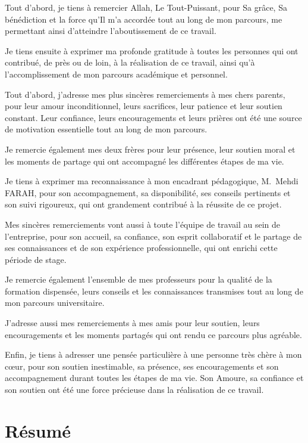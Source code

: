 \documentclass[a4paper,12pt,oneside]{report}
\begin{document}
	Tout d'abord, je tiens \`a remercier Allah, Le Tout-Puissant, pour Sa gr\^ace, Sa b\'en\'ediction et la force qu'Il m'a accord\'ee tout au long de mon parcours, me permettant ainsi d'atteindre l'aboutissement de ce travail. 
	
	Je tiens ensuite \`a exprimer ma profonde gratitude \`a toutes les personnes qui ont contribu\'e, de pr\`es ou de loin, \`a la r\'ealisation de ce travail, ainsi qu'\`a l'accomplissement de mon parcours acad\'emique et personnel.
	
	Tout d'abord, j'adresse mes plus sinc\`eres remerciements \`a mes chers parents, pour leur amour inconditionnel, leurs sacrifices, leur patience et leur soutien constant. Leur confiance, leurs encouragements et leurs pri\`eres ont \'et\'e une source de motivation essentielle tout au long de mon parcours.
	
	Je remercie \'egalement mes deux fr\`eres pour leur pr\'esence, leur soutien moral et les moments de partage qui ont accompagn\'e les diff\'erentes \'etapes de ma vie.
	
	Je tiens \`a exprimer ma reconnaissance \`a mon encadrant p\'edagogique, M.~Mehdi FARAH, pour son accompagnement, sa disponibilit\'e, ses conseils pertinents et son suivi rigoureux, qui ont grandement contribu\'e \`a la r\'eussite de ce projet.
	
	Mes sinc\`eres remerciements vont aussi \`a toute l'\'equipe de travail au sein de l'entreprise, pour son accueil, sa confiance, son esprit collaboratif et le partage de ses connaissances et de son exp\'erience professionnelle, qui ont enrichi cette p\'eriode de stage.
	
	Je remercie \'egalement l'ensemble de mes professeurs pour la qualit\'e de la formation dispens\'ee, leurs conseils et les connaissances transmises tout au long de mon parcours universitaire.
	
	J'adresse aussi mes remerciements \`a mes amis pour leur soutien, leurs encouragements et les moments partag\'es qui ont rendu ce parcours plus agr\'eable.
	
	Enfin, je tiens \`a adresser une pens\'ee particuli\`ere \`a une personne tr\`es ch\`ere \`a mon c\oe ur, pour son soutien inestimable, sa pr\'esence, ses encouragements et son accompagnement durant toutes les \'etapes de ma vie. Son Amoure, sa confiance et son soutien ont \'et\'e une force pr\'ecieuse dans la r\'ealisation de ce travail.
	
	\chapter*{R\'esum\'e}
	\thispagestyle{plain}
	
\end{document}
